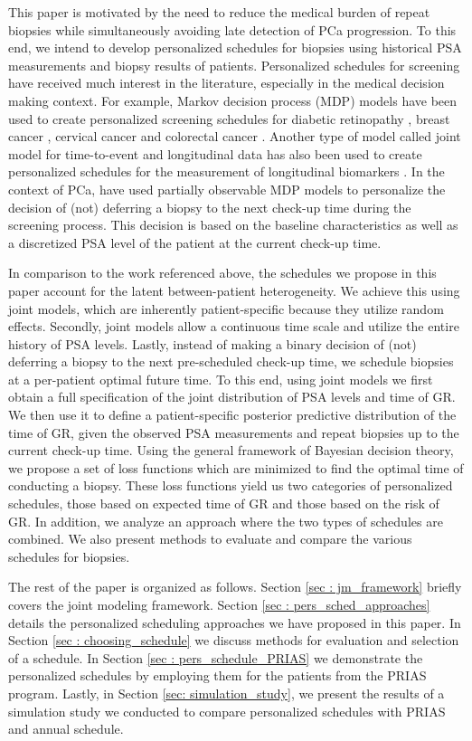 This paper is motivated by the need to reduce the medical burden of repeat biopsies while simultaneously avoiding late detection of PCa progression.
To this end, we intend to develop personalized schedules for biopsies using historical PSA measurements and biopsy results of patients. Personalized schedules for screening have received much interest in the literature, especially in the medical decision making context. For example, Markov decision process (MDP) models have been used to create personalized screening schedules for diabetic retinopathy \citep{bebu2017OptimalScreening}, breast cancer \citep*{ayer2012or}, cervical cancer \citep*{akhavan2017markov} and colorectal cancer \citep*{erenay2014optimizing}. Another type of model called joint model for time-to-event and longitudinal data \citep{tsiatis2004joint,rizopoulos2012joint} has also been used to create personalized schedules for the measurement of longitudinal biomarkers \citep{drizopoulosPersScreening}. In the context of PCa, \citet{zhang2012optimization} have used partially observable MDP models to personalize the decision of (not) deferring a biopsy to the next check-up time during the screening process. This decision is based on the baseline characteristics as well as a discretized PSA level of the patient at the current check-up time.

In comparison to the work referenced above, the schedules we propose in this paper account for the latent between-patient heterogeneity. We achieve this using joint models, which are inherently patient-specific because they utilize random effects. Secondly, joint models allow a continuous time scale and utilize the entire history of PSA levels. Lastly, instead of making a binary decision of (not) deferring a biopsy to the next pre-scheduled check-up time, we schedule biopsies at a per-patient optimal future time. To this end, using joint models we first obtain a full specification of the joint distribution of PSA levels and time of GR. We then use it to define a patient-specific posterior predictive distribution of the time of GR, given the observed PSA measurements and repeat biopsies up to the current check-up time. Using the general framework of Bayesian decision theory, we propose a set of loss functions which are minimized to find the optimal time of conducting a biopsy. These loss functions yield us two categories of personalized schedules, those based on expected time of GR and those based on the risk of GR. In addition, we analyze an approach where the two types of schedules are combined. We also present methods to evaluate and compare the various schedules for biopsies.

The rest of the paper is organized as follows. Section \ref{sec : jm_framework} briefly covers the joint modeling framework. Section \ref{sec : pers_sched_approaches} details the personalized scheduling approaches we have proposed in this paper. In Section \ref{sec : choosing_schedule} we discuss methods for evaluation and selection of a schedule. In Section \ref{sec : pers_schedule_PRIAS} we demonstrate the personalized schedules by employing them for the patients from the PRIAS program. Lastly, in Section \ref{sec: simulation_study}, we present the results of a simulation study we conducted to compare personalized schedules with PRIAS and annual schedule.